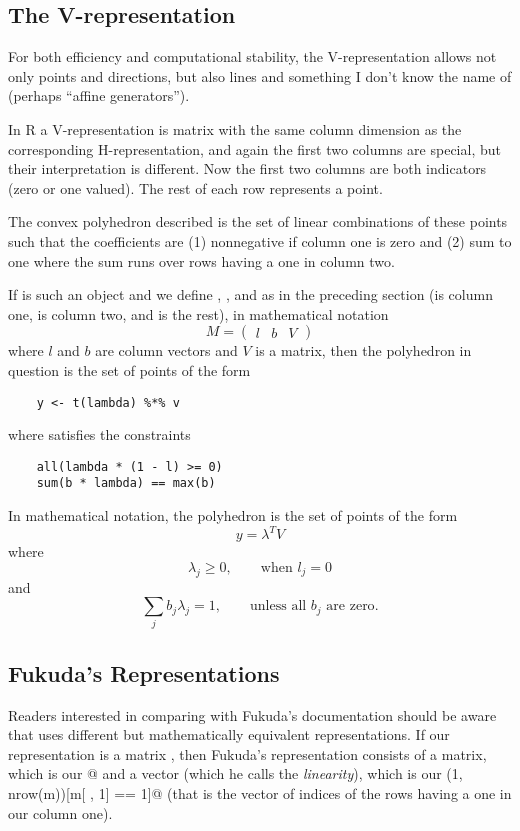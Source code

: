 \documentclass{article}
\begin{document}
\subsection{The V-representation}

For both efficiency and computational stability, the V-representation
allows not only points and directions, but also lines and something I
don't know the name of (perhaps ``affine generators'').

In R a V-representation is matrix with the same column dimension as
the corresponding H-representation, and again the first two columns
are special,
but their interpretation is different.  Now the first two columns
are both indicators (zero or one valued).  The rest of each row
represents a point.

The convex polyhedron described is the set of linear combinations of
these points such that the coefficients are (1) nonnegative if
column one is zero and (2) sum to one where the sum runs over
rows having a one in column two.

If \verb@m@ is such an object and we define \verb@v@, \verb@b@, and
\verb@l@ as in the preceding section (\verb@l@ is column one, \verb@b@ is
column two, and \verb@v@ is the rest),
in mathematical notation
$$
   M = \begin{pmatrix} l & b & V \end{pmatrix}
$$
where $l$ and $b$ are column vectors and $V$ is a matrix,
then the polyhedron in question
is the set of points of the form
\begin{verbatim}
    y <- t(lambda) %*% v
\end{verbatim}
where \verb@lambda@ satisfies the constraints
\begin{verbatim}
    all(lambda * (1 - l) >= 0)
    sum(b * lambda) == max(b)
\end{verbatim}
In mathematical notation, the polyhedron is the set of points of the form
$$
   y = \lambda^T V
$$
where
$$
   \lambda_j \ge 0, \qquad \text{when $l_j = 0$}
$$
and
$$
   \sum_j b_j \lambda_j = 1, \qquad \text{unless all $b_j$ are zero}.
$$

\subsection{Fukuda's Representations}

Readers interested in comparing with Fukuda's documentation should be
aware that \verb@cddlib@ uses different but mathematically equivalent
representations.
If our representation is a matrix \verb@m@, then Fukuda's representation
consists of a matrix, which is our \verb@m[ , -1]@ and a vector
(which he calls the \emph{linearity}), which is our
\verb@seq(1, nrow(m))[m[ , 1] == 1]@
(that is the vector of indices of the rows having a one in our column one).
\end{document}
